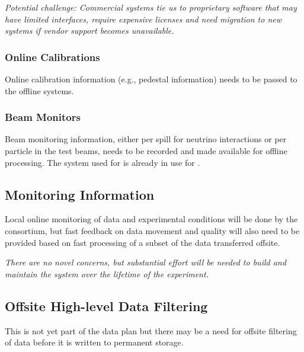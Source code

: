 \documentclass[../main-v1.tex]{subfiles}
\begin{document}
{\it Potential challenge: Commercial  systems tie us to proprietary software that may have limited interfaces, require expensive licenses and need migration to new systems if %
vendor support becomes unavailable.}

\subsubsection{Online Calibrations}
Online calibration information (e.g., pedestal information) needs to be passed to the offline systems. 


\subsubsection{Beam Monitors}
Beam monitoring information, either per spill for neutrino interactions or per particle in the  test beams, needs to be recorded and made available for offline processing. 
The  system used for  is already in use for .

\subsection{Monitoring Information} 
Local online monitoring of data and experimental conditions will be done by the  %
consortium, but fast feedback on data movement and quality will also need to be provided based on fast processing of a subset of the data transferred offsite. 

{\it There are no novel concerns, but substantial effort will be needed to build and maintain the system over the lifetime of the experiment.}

\subsection{Offsite High-level Data Filtering}

This is not yet part of the data plan but there may be a need for offsite filtering of data before %
it is written to permanent storage. 
\end{document}
